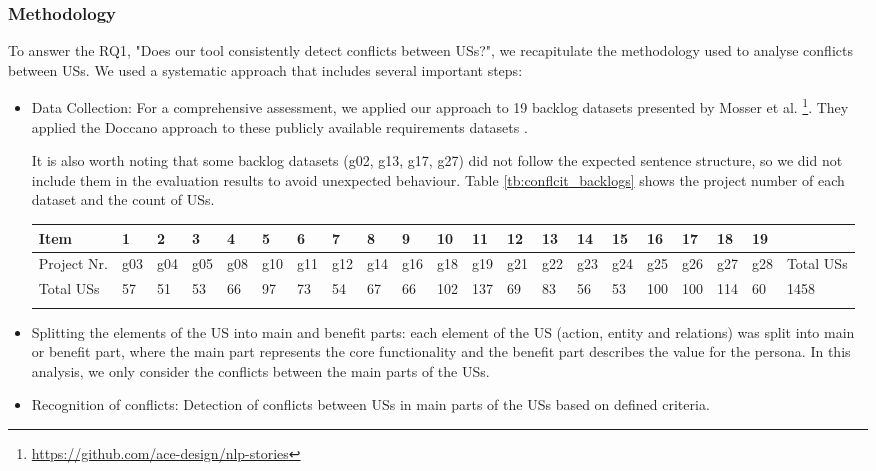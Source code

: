 \subsubsection*{Methodology}
To answer the RQ1, "Does our tool consistently detect conflicts between USs?", we recapitulate the methodology used to analyse conflicts between USs. We used a systematic approach that includes several important steps:
\begin{itemize}
	
	\item Data Collection: For a comprehensive assessment, we applied our approach to 19 backlog datasets presented by Mosser et al. \footnote{\href{https://github.com/ace-design/nlp-stories}{https://github.com/ace-design/nlp-stories}}. They applied the Doccano approach to these publicly available requirements datasets \cite{requirementsdatasets}.
	
	 It is also worth noting that some backlog datasets (g02, g13, g17, g27) did not follow the expected sentence structure, so we did not include them in the evaluation results to avoid unexpected behaviour. Table \ref{tb:conflcit_backlogs} shows the project number of each dataset and the count of USs.
	 
	\begingroup
	\centering
	\scriptsize
	\renewcommand{\arraystretch}{1.5} 
	\begin{tabularx}{\linewidth}{l|XXXXXXXXXXXXXXXXXXX X}
		Item&	1&	2&	3&	4&	5&	6&	7&	8&	9&	10&	11&	12&	13&	14&	15&	16&	17&	18&	19&	\\
		\hline
		Project Nr.&	g03	&g04	&g05	&g08	&g10	&g11	&g12	&g14	&g16	&g18	&g19	&g21	&g22	&g23	&g24	&g25	&g26	&g27	&g28	&Total USs\\
		\hline
		Total USs&	57&	51	&53	&66	&97	&73	&54	&67	&66	&102	&137	&69	&83	&56	&53	&100	&100	&114	&60	&1458 \\
		\caption{Project number and count of USs contained in each backlog dataset}\label{tb:conflcit_backlogs}
	\end{tabularx}	
	\endgroup
	\item Splitting the elements of the US into main and benefit parts: each element of the US (action, entity and relations) was split into main or benefit part, where the main part represents the core functionality and the benefit part describes the value for the persona. In this analysis, we only consider the conflicts between the main parts of the USs.
	
	\item Recognition of conflicts: Detection of conflicts between USs in main parts of the USs based on defined criteria.
	
\end{itemize}
